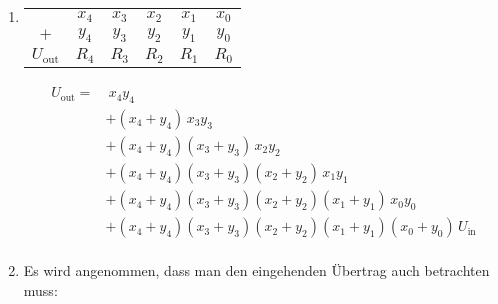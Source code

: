 \begin{enumerate}[label={[OH\arabic*]},start=12]
    \item
        \begin{enumerate}[label={(\alph*)}]
            \item \blanko
                \vspace{-\baselineskip}
                \begin{center}
                    \begin{tabular}{c *{5}{@{\,}c}}
                              & $x_4$ & $x_3$ & $x_2$ & $x_1$ & $x_0$ \\
                        $+$   & $y_4$ & $y_3$ & $y_2$ & $y_1$ & $y_0$ \\
                        \hline
                        $U_{\text{out}}$ & $R_4$ & $R_3$ & $R_2$ & $R_1$ & $R_0$
                    \end{tabular}
                \end{center}
                \begin{align*}
                    U_{\text{out}} = &~ x_4y_4 \\
                    &+ (x_4 + y_4)\,x_3y_3 \\
                    &+ (x_4 + y_4)(x_3+y_3)\,x_2y_2 \\
                    &+ (x_4 + y_4)(x_3+y_3)(x_2+y_2)\,x_1y_1 \\
                    &+ (x_4 + y_4)(x_3+y_3)(x_2+y_2)(x_1+y_1)\,x_0y_0 \\
                    &+ (x_4 + y_4)(x_3+y_3)(x_2+y_2)(x_1+y_1)(x_0 + y_0)\,U_\text{in} \\
                \end{align*}
            \newpage
            \item Es wird angenommen, dass man den eingehenden Übertrag auch betrachten muss:
                \makeatletter
                    \setlength{\leftmargins}{\@totalleftmargin}
                \makeatother


\end{enumerate}
\end{enumerate}
